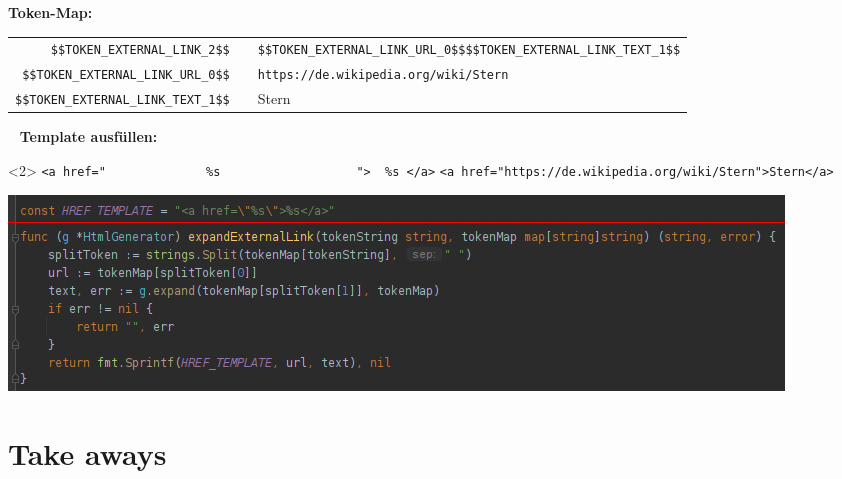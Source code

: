 \documentclass[9pt]{beamer}
\begin{document}
	\begin{frame}[fragile]
		\textbf{Token-Map:}\n
		\hspace{-0.65cm}
		\addtolength{\tabcolsep}{-0.5\tabcolsep}
		\begin{tabularx}{\textwidth}{rcp{6cm}}
			\verb+$$TOKEN_EXTERNAL_LINK_2$$+		& \textrightarrow & \verb+$$TOKEN_EXTERNAL_LINK_URL_0$$+\newline\verb+$$TOKEN_EXTERNAL_LINK_TEXT_1$$+\\
			\verb+$$TOKEN_EXTERNAL_LINK_URL_0$$+	& \textrightarrow & \verb+https://de.wikipedia.org/wiki/Stern+\\
			\verb+$$TOKEN_EXTERNAL_LINK_TEXT_1$$+	& \textrightarrow & Stern\\
		\end{tabularx}
		~\n\pause
		\textbf{Template ausfüllen:}\n
		\begin{onlyenv}<2>
			\verb+<a href="              %s                   ">  %s </a>+
			\verb+<a href="https://de.wikipedia.org/wiki/Stern">Stern</a>+
		\end{onlyenv}
		{
			\includegraphics[width=\linewidth]{images/code-html-generation.png}
		}
	\end{frame}
	
	\section{Take aways}
\end{document}
